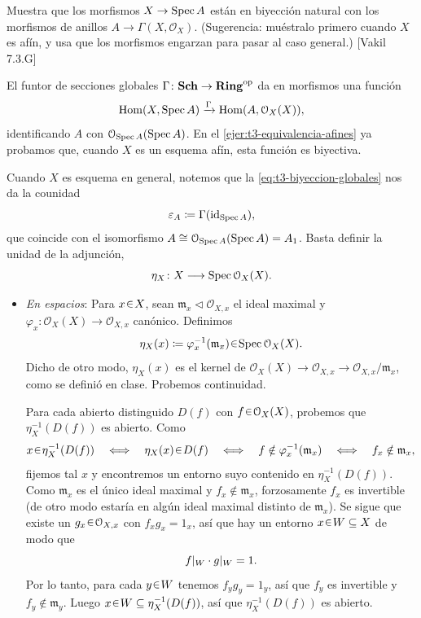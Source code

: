 \begin{ejer}\label{ejer:t3-morfismos-hacia-afin}
Muestra que los morfismos $X\to\operatorname{Spec} A$ están en biyección natural con los morfismos de anillos $A\to\Gamma(X,\mathcal O_X)$. (Sugerencia: muéstralo primero cuando $X$ es afín, y usa que los morfismos engarzan para pasar al caso general.) \hfill [Vakil 7.3.G]
\end{ejer}
\begin{sol}
El funtor de secciones globales $\Gamma\colon\mathbf{Sch}\to\mathbf{Ring}^{\mathrm{op}}$ da en morfismos una función
\begin{equation}\label{eq:t3-biyeccion-globales}
\operatorname{Hom}(X,\operatorname{Spec} A)\xrightarrow{\Gamma}\operatorname{Hom}(A,\mathcal O_X(X)),
\end{equation}
identificando $A$ con $\mathcal O_{\operatorname{Spec} A}(\operatorname{Spec} A)$. En el \cref{ejer:t3-equivalencia-afines} ya probamos que, cuando $X$ es un esquema afín, esta función es biyectiva.

Cuando $X$ es esquema en general, notemos que la \cref{eq:t3-biyeccion-globales} nos da la counidad
\[
\varepsilon_A\coloneq\Gamma(\operatorname{id}_{\operatorname{Spec} A}),
\]
que coincide con el isomorfismo $A\cong\mathcal O_{\operatorname{Spec} A}(\operatorname{Spec} A)=A_1$. Basta definir la unidad de la adjunción,
\[
\eta_X\colon X\longrightarrow\operatorname{Spec}\mathcal O_X(X).
\]
\begin{itemize}
\item \emph{En espacios}: Para $x\en X$, sean $\mathfrak m_x\triangleleft\mathcal O_{X,x}$ el ideal maximal y $\varphi_x\colon\mathcal O_X(X)\to\mathcal O_{X,x}$ canónico. Definimos
\[
\eta_X(x)\coloneq\varphi_x^{-1}(\mathfrak m_x)\en\Spec\mathcal O_X(X).
\]
Dicho de otro modo, $\eta_X(x)$ es el kernel de $\mathcal O_X(X)\to\mathcal O_{X,x}\to\mathcal O_{X,x}/\mathfrak m_x$, como se definió en clase. Probemos continuidad.

Para cada abierto distinguido $D(f)$ con $f\en\mathcal O_X(X)$, probemos que $\eta_X^{-1}(D(f))$ es abierto. Como
\[
x\en\eta_X^{-1}(D(f))
\quad\Longleftrightarrow\quad\eta_X(x)\en D(f)
\quad\Longleftrightarrow\quad f\notin\varphi_x^{-1}(\mathfrak m_x)
\quad\Longleftrightarrow\quad f_x\notin\mathfrak m_x,
\]
fijemos tal $x$ y encontremos un entorno suyo contenido en $\eta_X^{-1}(D(f))$. Como $\mathfrak m_x$ es el único ideal maximal y $f_x\notin\mathfrak m_x$, forzosamente $f_x$ es invertible (de otro modo estaría en algún ideal maximal distinto de $\mathfrak m_x$). Se sigue que existe un $g_x\en\mathcal O_{X,x}$ con $f_x g_x=1_x$, así que hay un entorno $x\en W\subseteq X$ de modo que
\[
\restr{f}{W}\cdot\restr{g}{W}=1.
\]
Por lo tanto, para cada $y\en W$ tenemos $f_y g_y=1_y$, así que $f_y$ es invertible y $f_y\notin\mathfrak m_y$. Luego $x\en W\subseteq\eta_X^{-1}(D(f))$, así que $\eta_X^{-1}(D(f))$ es abierto.


\end{itemize}
\end{sol}
